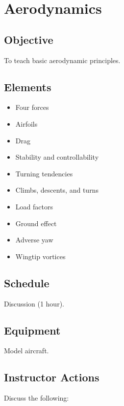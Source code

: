 \section{Aerodynamics}

\subsection{Objective}

To teach basic aerodynamic principles.

\subsection{Elements}

\begin{itemize}
  \item Four forces
  \item Airfoils
  \item Drag
  \item Stability and controllability
  \item Turning tendencies
  \item Climbs, descents, and turns
  \item Load factors
  \item Ground effect
  \item Adverse yaw
  \item Wingtip vortices
\end{itemize}

\subsection{Schedule}

Discussion (1 hour).

\subsection{Equipment}

Model aircraft.

\subsection{Instructor Actions}

Discuss the following:

